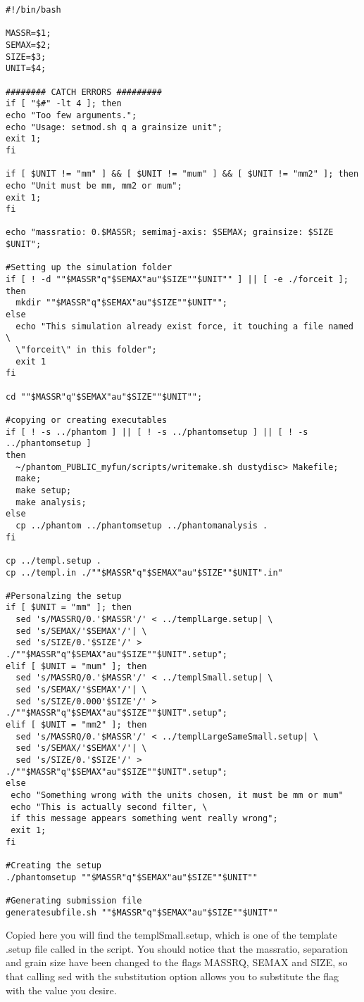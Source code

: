 \documentclass[10pt,a4paper,twoside]{article} %
\begin{document}
\begin{verbatim}
#!/bin/bash

MASSR=$1;
SEMAX=$2;
SIZE=$3;
UNIT=$4;

######## CATCH ERRORS #########
if [ "$#" -lt 4 ]; then
echo "Too few arguments.";
echo "Usage: setmod.sh q a grainsize unit";
exit 1;
fi

if [ $UNIT != "mm" ] && [ $UNIT != "mum" ] && [ $UNIT != "mm2" ]; then
echo "Unit must be mm, mm2 or mum";
exit 1;
fi

echo "massratio: 0.$MASSR; semimaj-axis: $SEMAX; grainsize: $SIZE $UNIT";

#Setting up the simulation folder
if [ ! -d ""$MASSR"q"$SEMAX"au"$SIZE""$UNIT"" ] || [ -e ./forceit ]; then
  mkdir ""$MASSR"q"$SEMAX"au"$SIZE""$UNIT"";
else
  echo "This simulation already exist force, it touching a file named \
  \"forceit\" in this folder";
  exit 1
fi

cd ""$MASSR"q"$SEMAX"au"$SIZE""$UNIT"";

#copying or creating executables
if [ ! -s ../phantom ] || [ ! -s ../phantomsetup ] || [ ! -s ../phantomsetup ]
then
  ~/phantom_PUBLIC_myfun/scripts/writemake.sh dustydisc> Makefile;
  make;
  make setup;
  make analysis;
else
  cp ../phantom ../phantomsetup ../phantomanalysis .
fi

cp ../templ.setup .
cp ../templ.in ./""$MASSR"q"$SEMAX"au"$SIZE""$UNIT".in"

#Personalzing the setup
if [ $UNIT = "mm" ]; then
  sed 's/MASSRQ/0.'$MASSR'/' < ../templLarge.setup| \
  sed 's/SEMAX/'$SEMAX'/'| \
  sed 's/SIZE/0.'$SIZE'/' > ./""$MASSR"q"$SEMAX"au"$SIZE""$UNIT".setup";
elif [ $UNIT = "mum" ]; then
  sed 's/MASSRQ/0.'$MASSR'/' < ../templSmall.setup| \
  sed 's/SEMAX/'$SEMAX'/'| \
  sed 's/SIZE/0.000'$SIZE'/' > ./""$MASSR"q"$SEMAX"au"$SIZE""$UNIT".setup";
elif [ $UNIT = "mm2" ]; then
  sed 's/MASSRQ/0.'$MASSR'/' < ../templLargeSameSmall.setup| \
  sed 's/SEMAX/'$SEMAX'/'| \
  sed 's/SIZE/0.'$SIZE'/' > ./""$MASSR"q"$SEMAX"au"$SIZE""$UNIT".setup";
else
 echo "Something wrong with the units chosen, it must be mm or mum"
 echo "This is actually second filter, \
 if this message appears something went really wrong";
 exit 1;
fi

#Creating the setup
./phantomsetup ""$MASSR"q"$SEMAX"au"$SIZE""$UNIT""

#Generating submission file
generatesubfile.sh ""$MASSR"q"$SEMAX"au"$SIZE""$UNIT""
\end{verbatim}

Copied here you will find the templSmall.setup, which is one of the template .setup file called in the script. You should notice that the massratio, separation and grain size have been changed to the flags MASSRQ, SEMAX and SIZE, so that calling sed with the substitution option allows you to substitute the flag with the value you desire. 
\end{document}
